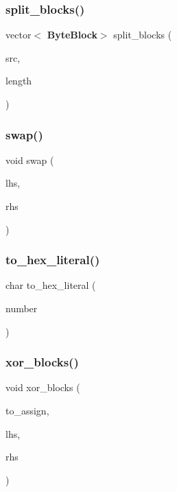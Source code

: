 \mbox{\label{mycrypto_8cpp_aca8f1e35e07bad7877de3f38099a9ebf}} 
\subsubsection{split\+\_\+blocks()}
{\footnotesize\ttfamily vector$<$\textbf{ Byte\+Block}$>$ split\+\_\+blocks (\begin{DoxyParamCaption}\item[{const \textbf{ Byte\+Block} \&}]{src,  }\item[{size\+\_\+t}]{length }\end{DoxyParamCaption})}

\mbox{\label{mycrypto_8cpp_aff71aa0d084ae3b604be05fa66e1d4cd}} 
\subsubsection{swap()}
{\footnotesize\ttfamily void swap (\begin{DoxyParamCaption}\item[{\textbf{ Byte\+Block} \&}]{lhs,  }\item[{\textbf{ Byte\+Block} \&}]{rhs }\end{DoxyParamCaption})}

\mbox{\label{mycrypto_8cpp_abf3d7cc2f7701e78a90341a4548e1086}} 
\subsubsection{to\+\_\+hex\+\_\+literal()}
{\footnotesize\ttfamily char to\+\_\+hex\+\_\+literal (\begin{DoxyParamCaption}\item[{\textbf{ B\+Y\+TE}}]{number }\end{DoxyParamCaption})\hspace{0.3cm}{\ttfamily [inline]}}

\mbox{\label{mycrypto_8cpp_a66b7e84b7ce7f030d3201391fb1d87a0}} 
\subsubsection{xor\+\_\+blocks()}
{\footnotesize\ttfamily void xor\+\_\+blocks (\begin{DoxyParamCaption}\item[{\textbf{ Byte\+Block} \&}]{to\+\_\+assign,  }\item[{const \textbf{ Byte\+Block} \&}]{lhs,  }\item[{const \textbf{ Byte\+Block} \&}]{rhs }\end{DoxyParamCaption})}


